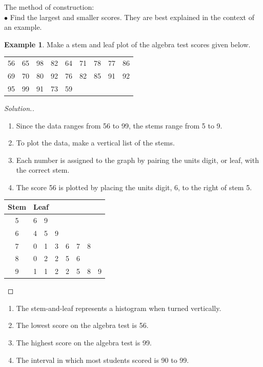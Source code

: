 \documentclass[11pt,a4paper]{article}
\theoremstyle{definition}
\newtheorem{example}[thm]{Example}
\newenvironment{solution}
  {\renewcommand{\qedsymbol}{}\begin{proof}[\textit{Solution}.]}
  {\end{proof}}
\begin{document}
The method of construction:\\
$\bullet$ Find the largest and smaller scores. They are best explained in the context of an example.\\


\begin{example}
Make a stem and leaf plot of the algebra test scores given below.
\begin{table}[H]
\centering
\begin{tabular}{ccccccccc}
56 & 65 & 98 & 82 & 64 & 71 & 78 & 77 & 86\\
69 & 70 & 80 & 92 & 76 & 82 & 85 & 91 & 92\\
95 & 99 & 91 & 73 & 59
\end{tabular}
\end{table}
\end{example}



\begin{solution}
\begin{enumerate}
\item[$\bullet$] Since the data ranges from 56 to 99, the stems range from 5 to 9.
\item[$\bullet$] To plot the data, make a vertical list of the stems.
\item[$\bullet$] Each number is assigned to the graph by pairing the units digit, or leaf, with the correct stem.
\item[$\bullet$] The score 56 is plotted by placing the units digit, 6, to the right of stem 5.
\end{enumerate}


\begin{table}[H]
\centering
\begin{tabular}{c|ccccccc}
Stem & \multicolumn{7}{l}{Leaf}\\
\hline
5 & 6 & 9 &   &  &  & & \\
6 & 4 & 5 & 9 &  &  & & \\
7 & 0 & 1 & 3 & 6 & 7 & 8 & \\
8 & 0 & 2 & 2 & 5 & 6 & & \\
9 & 1 & 1 & 2 & 2 & 5 & 8 & 9\\
\end{tabular}
\end{table}
\end{solution}





\begin{enumerate}
\item[$\bullet$] The stem-and-leaf represents a histogram when turned vertically.
\item[$\bullet$] The lowest score on the algebra test is 56.
\item[$\bullet$] The highest score on the algebra test is 99.
\item[$\bullet$] The interval in which most students scored is 90 to 99.\\
\end{enumerate}
\end{document}
